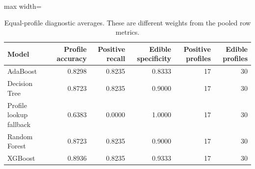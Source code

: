 \begin{table}[H]
\centering\small
\caption{Equal-profile diagnostic averages. These are different weights from the pooled row metrics.}
\begin{adjustbox}{max width=\linewidth}\begin{tabular}{lrrrrr}
\toprule
Model & Profile accuracy & Positive recall & Edible specificity & Positive profiles & Edible profiles \\
\midrule
AdaBoost & 0.8298 & 0.8235 & 0.8333 & 17 & 30 \\
Decision Tree & 0.8723 & 0.8235 & 0.9000 & 17 & 30 \\
Profile lookup fallback & 0.6383 & 0.0000 & 1.0000 & 17 & 30 \\
Random Forest & 0.8723 & 0.8235 & 0.9000 & 17 & 30 \\
XGBoost & 0.8936 & 0.8235 & 0.9333 & 17 & 30 \\
\bottomrule
\end{tabular}\end{adjustbox}
\end{table}
